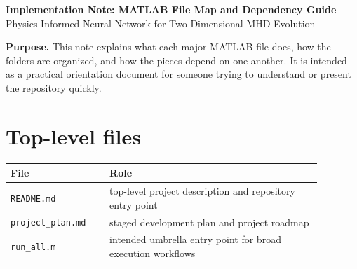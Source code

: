 \documentclass[11pt]{article}
\begin{document}
\begin{center}
    {\LARGE \bfseries \color{TitleBlue} Implementation Note: MATLAB File Map and Dependency Guide}\\[0.5em]
    {\large \color{AccentTeal} Physics-Informed Neural Network for Two-Dimensional MHD Evolution}
\end{center}

\vspace{0.5em}

\begin{overviewbox}
\textbf{Purpose.} This note explains what each major MATLAB file does, how the folders are organized, and how the pieces depend on one another. It is intended as a practical orientation document for someone trying to understand or present the repository quickly.
\end{overviewbox}

\section{Top-level files}
\begin{center}
\begin{tabular}{p{0.28\linewidth} p{0.60\linewidth}}
\toprule
\textbf{File} & \textbf{Role} \\
\midrule
\texttt{README.md} & top-level project description and repository entry point \\
\texttt{project\_plan.md} & staged development plan and project roadmap \\
\texttt{run\_all.m} & intended umbrella entry point for broad execution workflows \\
\bottomrule
\end{tabular}
\end{center}
\end{document}

